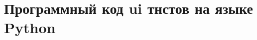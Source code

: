 \chapter{Программный код ui тнстов на языке Python}\label{appendix-extra-examples}

\begin{lstlisting}[language=Python]

\end{lstlisting}



